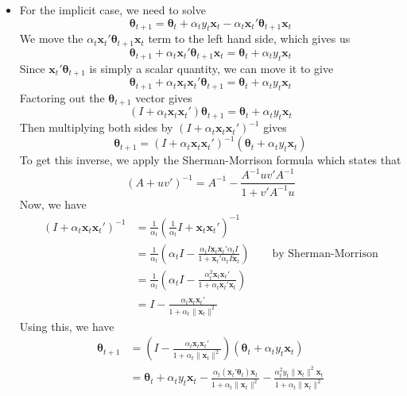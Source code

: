 \documentclass[letterpaper,10pt]{amsart}
\begin{document}
\begin{enumerate}[1.]
\begin{enumerate}[(a)]
\begin{itemize}
\item
For the implicit case, we need to solve
\[\boldsymbol \theta_{t+1} = \boldsymbol \theta_t + \alpha _t y_t \boldsymbol x_t - \alpha_t \boldsymbol x_t' \boldsymbol \theta_{t+1} \boldsymbol x_t\]
We move the $\alpha_t \boldsymbol x_t' \boldsymbol \theta_{t+1} \boldsymbol x_t$ term to the left hand side, which gives us
\[\boldsymbol \theta_{t+1} + \alpha_t \boldsymbol x_t' \boldsymbol \theta_{t+1} \boldsymbol x_t = \boldsymbol \theta_t + \alpha_t y_t \boldsymbol x_t\]
Since $\boldsymbol x_t' \boldsymbol \theta_{t+1}$ is simply a scalar quantity, we can move it to give
\[\boldsymbol \theta_{t+1} + \alpha_t  \boldsymbol x_t \boldsymbol x_t' \boldsymbol \theta_{t+1}= \boldsymbol \theta_t + \alpha_t y_t \boldsymbol x_t\]
Factoring out the $\boldsymbol \theta_{t+1}$ vector gives
\[(I + \alpha_t \boldsymbol x_t \boldsymbol x_t') \boldsymbol \theta_{t+1} = \boldsymbol \theta_t + \alpha_t y_t \boldsymbol x_t\]
Then multiplying both sides by $(I + \alpha_t \boldsymbol x_t \boldsymbol x_t')^{-1}$ gives
\[\boldsymbol \theta_{t+1} = (I + \alpha_t \boldsymbol x_t \boldsymbol x_t')^{-1} (\boldsymbol \theta_t + \alpha_t y_t \boldsymbol x_t)\]
To get this inverse, we apply the Sherman-Morrison formula which states that
\[(A + uv')^{-1} = A^{-1} - \frac{A^{-1} uv' A^{-1}}{1 + v'A^{-1} u}\]
Now, we have 
\begin{align*}
(I + \alpha_t \boldsymbol x_t \boldsymbol x_t')^{-1} &= \frac{1}{\alpha_t}\left(\frac{1}{\alpha_t}I + \boldsymbol x_t \boldsymbol x_t' \right)^{-1}\\
&= \frac{1}{\alpha_t}\left(\alpha_t I - \frac{\alpha_t I \boldsymbol x_t \boldsymbol x_t' \alpha_t I}{1 + \boldsymbol x_t' \alpha_t I \boldsymbol x_t}\right) \qquad \text{by Sherman-Morrison}\\
&= \frac{1}{\alpha_t} \left(\alpha_t I - \frac{\alpha_t^2 \boldsymbol x_t \boldsymbol x_t'}{1 + \alpha_t \boldsymbol x_t' \boldsymbol x_t}\right)\\
&= I - \frac{\alpha_t \boldsymbol x_t \boldsymbol x_t'}{1 + \alpha_t \|\boldsymbol x_t\|^2}
\end{align*}
Using this, we have
\begin{align*}
\boldsymbol \theta_{t+1} &= \left(I - \frac{\alpha_t \boldsymbol x_t \boldsymbol x_t'}{1 + \alpha_t \|\boldsymbol x_t\|^2}\right) (\boldsymbol \theta_t + \alpha_t y_t \boldsymbol x_t)\\
&= \boldsymbol \theta_t + \alpha_t y_t \boldsymbol x_t - \frac{\alpha_t (\boldsymbol x_t' \boldsymbol \theta_t) \boldsymbol x_t}{1 + \alpha_t \|\boldsymbol x_t\|^2} - \frac{\alpha_t^2 y_t \|\boldsymbol x_t\|^2 \boldsymbol x_t}{1 + \alpha_t \|\boldsymbol x_t\|^2}

\end{align*}
\end{itemize}
\end{enumerate}
\end{enumerate}
\end{document}
